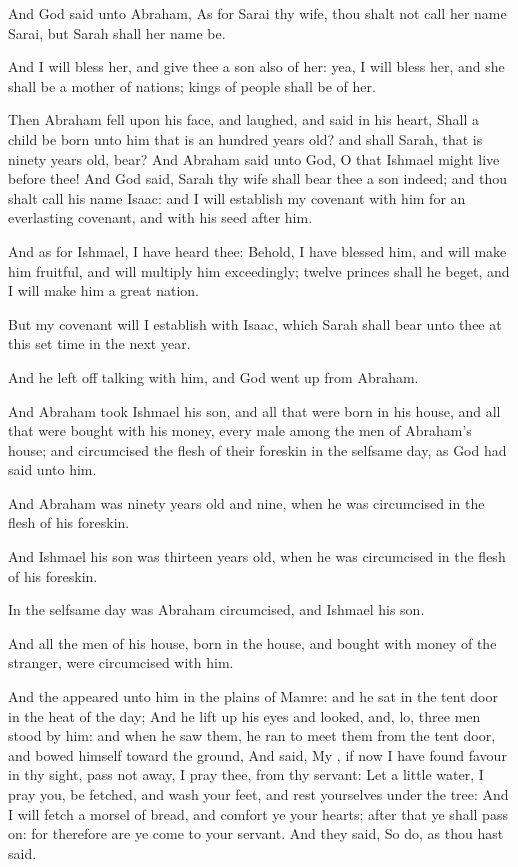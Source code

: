 \Verse And God said unto Abraham, As for Sarai thy wife, thou shalt not call her name Sarai, but Sarah shall her name be.

\Verse And I will bless her, and give thee a son also of her: yea, I will bless her, and she shall be a mother of nations; kings of people shall be of her.

\Verse Then Abraham fell upon his face, and laughed, and said in his heart, Shall a child be born unto him that is an hundred years old?  and shall Sarah, that is ninety years old, bear?  \Verse And Abraham said unto God, O that Ishmael might live before thee!  \Verse And God said, Sarah thy wife shall bear thee a son indeed; and thou shalt call his name Isaac: and I will establish my covenant with him for an everlasting covenant, and with his seed after him.

\Verse And as for Ishmael, I have heard thee: Behold, I have blessed him, and will make him fruitful, and will multiply him exceedingly; twelve princes shall he beget, and I will make him a great nation.

\Verse But my covenant will I establish with Isaac, which Sarah shall bear unto thee at this set time in the next year.

\Verse And he left off talking with him, and God went up from Abraham.

\Verse And Abraham took Ishmael his son, and all that were born in his house, and all that were bought with his money, every male among the men of Abraham's house; and circumcised the flesh of their foreskin in the selfsame day, as God had said unto him.

\Verse And Abraham was ninety years old and nine, when he was circumcised in the flesh of his foreskin.

\Verse And Ishmael his son was thirteen years old, when he was circumcised in the flesh of his foreskin.

\Verse In the selfsame day was Abraham circumcised, and Ishmael his son.

\Verse And all the men of his house, born in the house, and bought with money of the stranger, were circumcised with him.

\Chapter
\Verse And the \LORD appeared unto him in the plains of Mamre: and he sat in the tent door in the heat of the day; \Verse And he lift up his eyes and looked, and, lo, three men stood by him: and when he saw them, he ran to meet them from the tent door, and bowed himself toward the ground, \Verse And said, My \LORD, if now I have found favour in thy sight, pass not away, I pray thee, from thy servant: \Verse Let a little water, I pray you, be fetched, and wash your feet, and rest yourselves under the tree: \Verse And I will fetch a morsel of bread, and comfort ye your hearts; after that ye shall pass on: for therefore are ye come to your servant. And they said, So do, as thou hast said.


